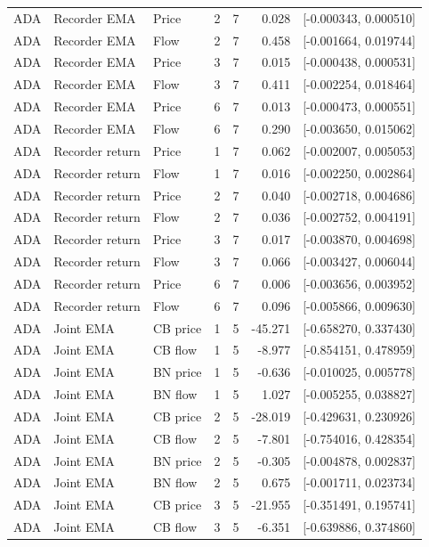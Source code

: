 \begin{longtable}{lllrrrl}
ADA & Recorder EMA & Price & 2 & 7 & 0.028 & [-0.000343, 0.000510]\\
ADA & Recorder EMA & Flow & 2 & 7 & 0.458 & [-0.001664, 0.019744]\\
ADA & Recorder EMA & Price & 3 & 7 & 0.015 & [-0.000438, 0.000531]\\
ADA & Recorder EMA & Flow & 3 & 7 & 0.411 & [-0.002254, 0.018464]\\
ADA & Recorder EMA & Price & 6 & 7 & 0.013 & [-0.000473, 0.000551]\\
ADA & Recorder EMA & Flow & 6 & 7 & 0.290 & [-0.003650, 0.015062]\\
ADA & Recorder return & Price & 1 & 7 & 0.062 & [-0.002007, 0.005053]\\
ADA & Recorder return & Flow & 1 & 7 & 0.016 & [-0.002250, 0.002864]\\
ADA & Recorder return & Price & 2 & 7 & 0.040 & [-0.002718, 0.004686]\\
ADA & Recorder return & Flow & 2 & 7 & 0.036 & [-0.002752, 0.004191]\\
ADA & Recorder return & Price & 3 & 7 & 0.017 & [-0.003870, 0.004698]\\
ADA & Recorder return & Flow & 3 & 7 & 0.066 & [-0.003427, 0.006044]\\
ADA & Recorder return & Price & 6 & 7 & 0.006 & [-0.003656, 0.003952]\\
ADA & Recorder return & Flow & 6 & 7 & 0.096 & [-0.005866, 0.009630]\\
ADA & Joint EMA & CB price & 1 & 5 & -45.271 & [-0.658270, 0.337430]\\
ADA & Joint EMA & CB flow & 1 & 5 & -8.977 & [-0.854151, 0.478959]\\
ADA & Joint EMA & BN price & 1 & 5 & -0.636 & [-0.010025, 0.005778]\\
ADA & Joint EMA & BN flow & 1 & 5 & 1.027 & [-0.005255, 0.038827]\\
ADA & Joint EMA & CB price & 2 & 5 & -28.019 & [-0.429631, 0.230926]\\
ADA & Joint EMA & CB flow & 2 & 5 & -7.801 & [-0.754016, 0.428354]\\
ADA & Joint EMA & BN price & 2 & 5 & -0.305 & [-0.004878, 0.002837]\\
ADA & Joint EMA & BN flow & 2 & 5 & 0.675 & [-0.001711, 0.023734]\\
ADA & Joint EMA & CB price & 3 & 5 & -21.955 & [-0.351491, 0.195741]\\
ADA & Joint EMA & CB flow & 3 & 5 & -6.351 & [-0.639886, 0.374860]\\

\end{longtable}
